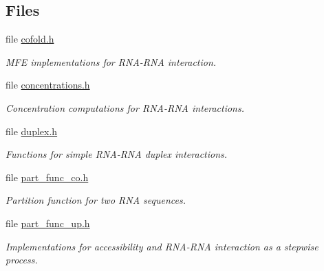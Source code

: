 \subsection*{Files}
\begin{DoxyCompactItemize}
\item 
file \hyperlink{cofold_8h}{cofold.\+h}
\begin{DoxyCompactList}\small\item\em M\+FE implementations for R\+N\+A-\/\+R\+NA interaction. \end{DoxyCompactList}\item 
file \hyperlink{concentrations_8h}{concentrations.\+h}
\begin{DoxyCompactList}\small\item\em Concentration computations for R\+N\+A-\/\+R\+NA interactions. \end{DoxyCompactList}\item 
file \hyperlink{duplex_8h}{duplex.\+h}
\begin{DoxyCompactList}\small\item\em Functions for simple R\+N\+A-\/\+R\+NA duplex interactions. \end{DoxyCompactList}\item 
file \hyperlink{part__func__co_8h}{part\+\_\+func\+\_\+co.\+h}
\begin{DoxyCompactList}\small\item\em Partition function for two R\+NA sequences. \end{DoxyCompactList}\item 
file \hyperlink{part__func__up_8h}{part\+\_\+func\+\_\+up.\+h}
\begin{DoxyCompactList}\small\item\em Implementations for accessibility and R\+N\+A-\/\+R\+NA interaction as a stepwise process. \end{DoxyCompactList}\end{DoxyCompactItemize}
